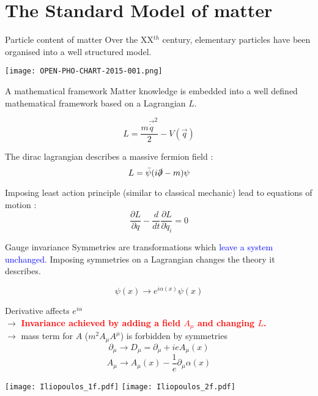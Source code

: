\section{The Standard Model of matter}
\begin{frame}{Particle content of matter}
    Over the XX$^{th}$ century, elementary particles have been organised into a well structured model.

  \begin{center} \texttt{[image: OPEN-PHO-CHART-2015-001.png]} \end{center}
\end{frame}
\begin{frame}{A mathematical framework}
  Matter knowledge is embedded into a well defined mathematical framework based on a Lagrangian $L$.

  \begin{equation}
    L = \frac{m \vec{\dot{q}}^2}{2} - V(\vec{q})
  \end{equation}

  The dirac lagrangian describes a massive fermion field :
  \begin{equation}
    L = \bar{\psi} ( i\slashed{\partial} - m ) \psi
  \end{equation}
  
  Imposing least action principle (similar to classical mechanic) lead to equations of motion :
  \begin{equation}
    \frac{\partial L}{\partial q} - \frac{d}{dt}\frac{\partial L}{\partial \dot{q}_i} = 0
  \end{equation}
  
\end{frame}
\begin{frame}{Gauge invariance}
  Symmetries are transformations which \textcolor{blue}{leave a system unchanged.}
  Imposing symmetries on a Lagrangian changes the theory it describes.
  \vfill
  
    \begin{equation}
      \psi(x)\rightarrow e^{i\alpha(x)}\psi(x)
    \end{equation}

    Derivative affects $e^{i\alpha}$\\
    $\rightarrow$ \textcolor{red}{\bf Invariance achieved by adding a field $A_\mu$ and changing $L$.} \\
    $\rightarrow$ mass term for $A$ ($m^2A_\mu A^\mu$) is forbidden by symmetries
    \begin{equation}
      \label{eq:orgc79752f}
      \partial_\mu\rightarrow D_\mu=\partial_\mu+ieA_\mu(x)
    \end{equation}
    \begin{equation}
      \label{eq:orge69917a}
      A_{\mu} \rightarrow A_\mu(x) - \frac{1}{e} {\partial_{\mu} \alpha(x)}
    \end{equation}


    \texttt{[image: Iliopoulos\_1f.pdf]}
    \texttt{[image: Iliopoulos\_2f.pdf]}


\end{frame}
